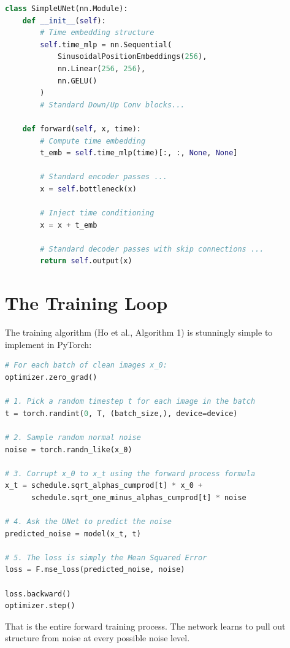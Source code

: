 \documentclass[12pt]{article}
\begin{document}
\begin{lstlisting}[language=Python, basicstyle=\small\ttfamily, commentstyle=\color{green!60!black}]
class SimpleUNet(nn.Module):
    def __init__(self):
        # Time embedding structure
        self.time_mlp = nn.Sequential(
            SinusoidalPositionEmbeddings(256),
            nn.Linear(256, 256),
            nn.GELU()
        )
        # Standard Down/Up Conv blocks...
        
    def forward(self, x, time):
        # Compute time embedding
        t_emb = self.time_mlp(time)[:, :, None, None]
        
        # Standard encoder passes ...
        x = self.bottleneck(x)
        
        # Inject time conditioning
        x = x + t_emb
        
        # Standard decoder passes with skip connections ...
        return self.output(x)
\end{lstlisting}

\section*{The Training Loop}
The training algorithm (Ho et al., Algorithm 1) is stunningly simple to implement in PyTorch:

\begin{lstlisting}[language=Python, basicstyle=\small\ttfamily, commentstyle=\color{green!60!black}]
# For each batch of clean images x_0:
optimizer.zero_grad()

# 1. Pick a random timestep t for each image in the batch
t = torch.randint(0, T, (batch_size,), device=device)

# 2. Sample random normal noise
noise = torch.randn_like(x_0)

# 3. Corrupt x_0 to x_t using the forward process formula
x_t = schedule.sqrt_alphas_cumprod[t] * x_0 + 
      schedule.sqrt_one_minus_alphas_cumprod[t] * noise

# 4. Ask the UNet to predict the noise
predicted_noise = model(x_t, t)

# 5. The loss is simply the Mean Squared Error
loss = F.mse_loss(predicted_noise, noise)

loss.backward()
optimizer.step()
\end{lstlisting}

That is the entire forward training process. The network learns to pull out structure from noise at every possible noise level.
\end{document}
